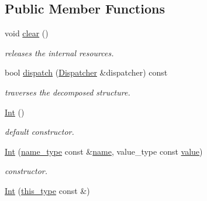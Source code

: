 \subsection*{Public Member Functions}
\begin{DoxyCompactItemize}
\item 
\hypertarget{classhryky_1_1reduction_1_1_int_a28f34f0cc9d9e362df1f9ccfe1c86d05}{void \hyperlink{classhryky_1_1reduction_1_1_int_a28f34f0cc9d9e362df1f9ccfe1c86d05}{clear} ()}\label{classhryky_1_1reduction_1_1_int_a28f34f0cc9d9e362df1f9ccfe1c86d05}

\begin{DoxyCompactList}\small\item\em releases the internal resources. \end{DoxyCompactList}\item 
bool \hyperlink{classhryky_1_1reduction_1_1_base_a71b31d4d0ed915254e2cb1ef217f28c4}{dispatch} (\hyperlink{classhryky_1_1reduction_1_1_dispatcher}{Dispatcher} \&dispatcher) const 
\begin{DoxyCompactList}\small\item\em traverses the decomposed structure. \end{DoxyCompactList}\item 
\hypertarget{classhryky_1_1reduction_1_1_int_ab8b8d68c4867648140a1d536d8f9fc63}{\hyperlink{classhryky_1_1reduction_1_1_int_ab8b8d68c4867648140a1d536d8f9fc63}{Int} ()}\label{classhryky_1_1reduction_1_1_int_ab8b8d68c4867648140a1d536d8f9fc63}

\begin{DoxyCompactList}\small\item\em default constructor. \end{DoxyCompactList}\item 
\hypertarget{classhryky_1_1reduction_1_1_int_a9ae93f0027ce3a1bc2fa9683d5ee30c8}{\hyperlink{classhryky_1_1reduction_1_1_int_a9ae93f0027ce3a1bc2fa9683d5ee30c8}{Int} (\hyperlink{namespacehryky_1_1reduction_ac686c30a4c8d196bbd0f05629a6b921f}{name\-\_\-type} const \&\hyperlink{classhryky_1_1reduction_1_1_base_a842569265d741905eb8a353d3935f1d1}{name}, value\-\_\-type const \hyperlink{classhryky_1_1reduction_1_1_int_a093933195e424d24a1fc1deba79c7c3c}{value})}\label{classhryky_1_1reduction_1_1_int_a9ae93f0027ce3a1bc2fa9683d5ee30c8}

\begin{DoxyCompactList}\small\item\em constructor. \end{DoxyCompactList}\item 
\hypertarget{classhryky_1_1reduction_1_1_int_aa632429a9fcd3ed75e5f0b019ed6a36d}{\hyperlink{classhryky_1_1reduction_1_1_int_aa632429a9fcd3ed75e5f0b019ed6a36d}{Int} (\hyperlink{classhryky_1_1reduction_1_1_base_af02a7dee6042080b7380afd2f9500a42}{this\-\_\-type} const \&)}\label{classhryky_1_1reduction_1_1_int_aa632429a9fcd3ed75e5f0b019ed6a36d}


\end{DoxyCompactItemize}
